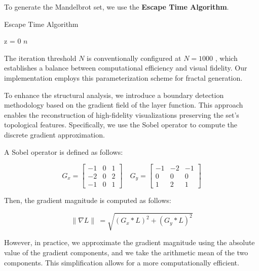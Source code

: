 To generate the Mandelbrot set, we use the \textbf{Escape Time Algorithm}.

\begin{algorithm}[H]
    \SetAlgoLined
    \caption{Escape Time Algorithm}
    \label{alg:escape_time_algorithm}
    z = 0\;
    \Return $n$\;
\end{algorithm}

The iteration threshold $N$ is conventionally configured at $N = 1000$
, which establishes a balance between computational efficiency and visual fidelity.
Our implementation employs this parameterization scheme for fractal generation.

To enhance the structural analysis, we introduce a boundary detection methodology based on the gradient field of the
layer function.
This approach enables the reconstruction of high-fidelity visualizations preserving the set's topological features.
Specifically, we use the Sobel operator\textsuperscript{\cite{sobel1968isotropic}}
to compute the discrete gradient approximation.

A Sobel operator is defined as follows:

\begin{equation}
    \label{eq:sobel_operator}
    G_x = \begin{bmatrix}
              -1 & 0 & 1 \\
              -2 & 0 & 2 \\
              -1 & 0 & 1
    \end{bmatrix}
    \quad
    G_y = \begin{bmatrix}
              -1 & -2 & -1 \\
              0  & 0  & 0  \\
              1  & 2  & 1
    \end{bmatrix}
\end{equation}

Then, the gradient magnitude is computed as follows:

\begin{equation}
    \label{eq:gradient_magnitude}
    \parallel \nabla L \parallel \ = \sqrt{(G_x * L)^2 + (G_y * L)^2}
\end{equation}

However, in practice, we approximate the gradient magnitude using the absolute value of the gradient components, and
we take the arithmetic mean of the two components.
This simplification allows for a more computationally efficient.

